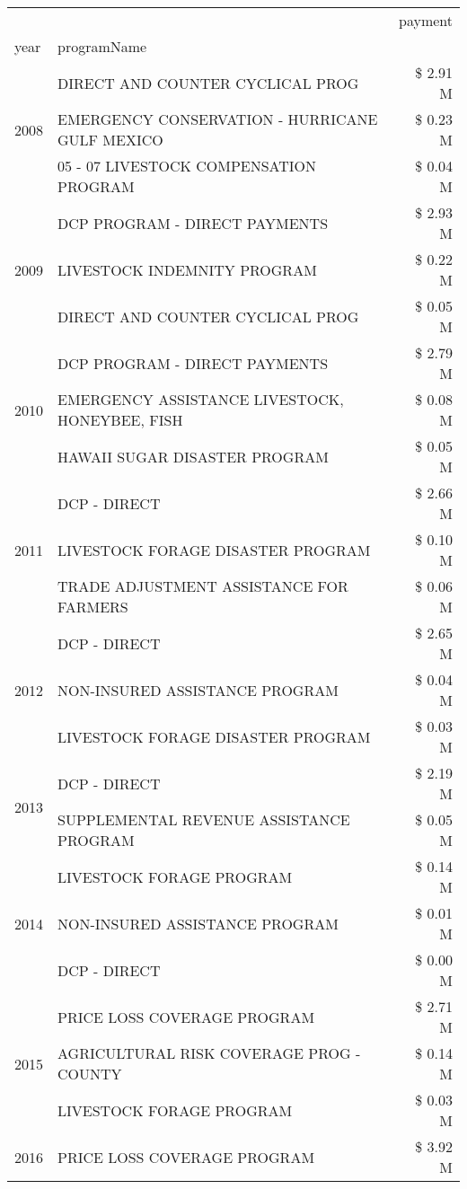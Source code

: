 \begin{tabular}{llr}
\toprule
 &  & payment \\
year & programName &  \\
\midrule
\multirow[t]{3}{*}{2008} & DIRECT AND COUNTER CYCLICAL PROG & \$ 2.91 M \\
 & EMERGENCY CONSERVATION - HURRICANE GULF MEXICO & \$ 0.23 M \\
 & 05 - 07 LIVESTOCK COMPENSATION PROGRAM & \$ 0.04 M \\
\cline{1-3}
\multirow[t]{3}{*}{2009} & DCP PROGRAM - DIRECT PAYMENTS & \$ 2.93 M \\
 & LIVESTOCK INDEMNITY PROGRAM & \$ 0.22 M \\
 & DIRECT AND COUNTER CYCLICAL PROG & \$ 0.05 M \\
\cline{1-3}
\multirow[t]{3}{*}{2010} & DCP PROGRAM - DIRECT PAYMENTS & \$ 2.79 M \\
 & EMERGENCY ASSISTANCE LIVESTOCK, HONEYBEE, FISH & \$ 0.08 M \\
 & HAWAII SUGAR DISASTER PROGRAM & \$ 0.05 M \\
\cline{1-3}
\multirow[t]{3}{*}{2011} & DCP - DIRECT & \$ 2.66 M \\
 & LIVESTOCK FORAGE DISASTER PROGRAM & \$ 0.10 M \\
 & TRADE ADJUSTMENT ASSISTANCE FOR FARMERS & \$ 0.06 M \\
\cline{1-3}
\multirow[t]{3}{*}{2012} & DCP - DIRECT & \$ 2.65 M \\
 & NON-INSURED ASSISTANCE PROGRAM & \$ 0.04 M \\
 & LIVESTOCK FORAGE DISASTER PROGRAM & \$ 0.03 M \\
\cline{1-3}
\multirow[t]{2}{*}{2013} & DCP - DIRECT & \$ 2.19 M \\
 & SUPPLEMENTAL REVENUE ASSISTANCE PROGRAM & \$ 0.05 M \\
\cline{1-3}
\multirow[t]{3}{*}{2014} & LIVESTOCK FORAGE PROGRAM & \$ 0.14 M \\
 & NON-INSURED ASSISTANCE PROGRAM & \$ 0.01 M \\
 & DCP - DIRECT & \$ 0.00 M \\
\cline{1-3}
\multirow[t]{3}{*}{2015} & PRICE LOSS COVERAGE PROGRAM & \$ 2.71 M \\
 & AGRICULTURAL RISK COVERAGE PROG - COUNTY & \$ 0.14 M \\
 & LIVESTOCK FORAGE PROGRAM & \$ 0.03 M \\
\cline{1-3}
\multirow[t]{2}{*}{2016} & PRICE LOSS COVERAGE PROGRAM & \$ 3.92 M \\

\end{tabular}
